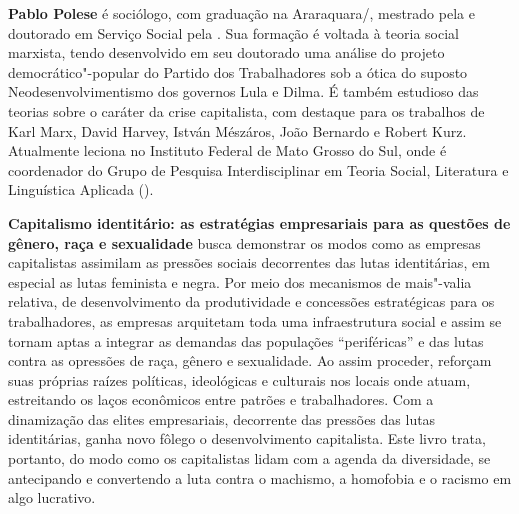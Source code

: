 \textbf{Pablo Polese} é sociólogo, com graduação na  Araraquara/, mestrado pela  e doutorado em Serviço Social pela . Sua formação é voltada à teoria social marxista, tendo desenvolvido em seu doutorado uma análise do projeto democrático"-popular do Partido dos Trabalhadores sob a ótica do suposto Neodesenvolvimentismo dos governos Lula e Dilma. É também estudioso das teorias sobre o caráter da crise capitalista, com destaque para os trabalhos de Karl Marx, David Harvey, István Mészáros, João Bernardo e Robert Kurz. Atualmente leciona no Instituto Federal de Mato Grosso do Sul, onde é coordenador do Grupo de Pesquisa Interdisciplinar em Teoria Social, Literatura e Linguística Aplicada (). 



\textbf{Capitalismo identitário: as estratégias empresariais para as questões de gênero, raça e sexualidade} busca demonstrar os modos como as empresas capitalistas assimilam as
pressões sociais decorrentes das lutas identitárias, em especial as
lutas feminista e negra. Por meio dos mecanismos de mais"-valia relativa,
de desenvolvimento da produtividade e concessões estratégicas para os
trabalhadores, as empresas arquitetam toda uma infraestrutura social e
assim se tornam aptas a integrar as demandas das populações
``periféricas'' e das lutas contra as opressões de raça, gênero e
sexualidade. Ao assim proceder, reforçam suas próprias raízes políticas,
ideológicas e culturais nos locais onde atuam, estreitando os laços
econômicos entre patrões e trabalhadores. Com a dinamização das elites
empresariais, decorrente das pressões das lutas identitárias, ganha novo
fôlego o desenvolvimento capitalista. Este livro trata, portanto, do
modo como os capitalistas lidam com a agenda da diversidade, se
antecipando e convertendo a luta contra o machismo, a homofobia e o
racismo em algo lucrativo.


